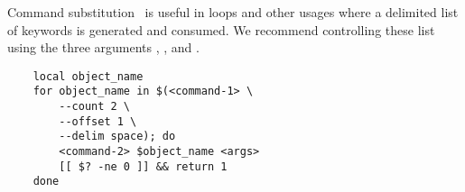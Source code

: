 Command substitution~\cite{command_substitution} is useful in  loops and other usages where a delimited list of keywords is generated and consumed. We recommend controlling these list using the three arguments , , and .
%
\begin{verbatim}
    local object_name
    for object_name in $(<command-1> \
        --count 2 \
        --offset 1 \
        --delim space); do
        <command-2> $object_name <args>
        [[ $? -ne 0 ]] && return 1
    done
\end{verbatim}